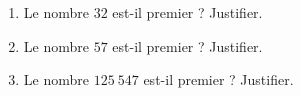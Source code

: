 \begin{minipage}{0.99\linewidth}
\exo
\begin{enumerate}
\item Le nombre $32$ est-il premier ? Justifier.
\item Le nombre $57$ est-il premier ? Justifier.
\item Le nombre $125~547$ est-il premier ? Justifier.
\end{enumerate}
\end{minipage}

\vspace{0.5cm}
